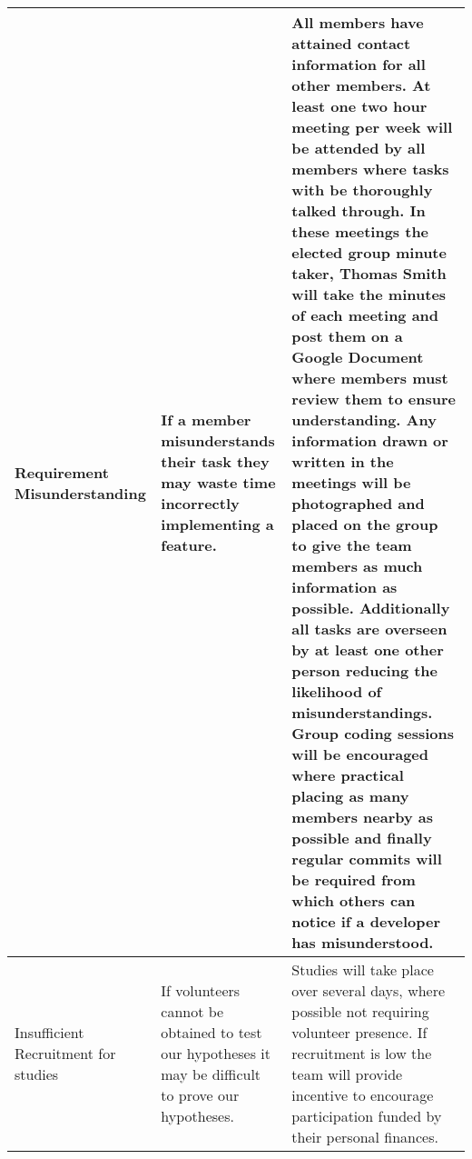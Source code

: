 \begin{center}
\begin{landscape}
\begin{longtable}{|p{3cm}|p{7cm}|p{12cm}|}
        Requirement Misunderstanding                    & If a member misunderstands their task they may waste time incorrectly implementing a feature.                                                                                                                                                                                                                                                                                & All members have attained contact information for all other members. At least one two hour meeting per week will be attended by all members where tasks with be thoroughly talked through. In these meetings the elected group minute taker, Thomas Smith will take the minutes of each meeting and post them on a Google Document where members must review them to ensure understanding. Any information drawn or written in the meetings will be photographed and placed on the group to give the team members as much information as possible. Additionally all tasks are overseen by at least one other person reducing the likelihood of misunderstandings. Group coding sessions will be encouraged where practical placing as many members nearby as possible and finally regular commits will be required from which others can notice if a developer has misunderstood.                                                                                                                                                         \\ \hline
        Insufficient Recruitment for studies             & If volunteers cannot be obtained to test our hypotheses it may be difficult to prove our hypotheses.                                                                                                                                                                                                                                                                         & Studies will take place over several days, where possible not requiring volunteer presence. If recruitment is low the team will provide incentive to encourage participation funded by their personal finances.                                                                                                                                                                                                                                                                                                                                                                                                                                                                                                                                                                                                                                                                                                                                                                                                                          \\ \hline

\end{longtable}
\end{landscape}
\end{center}
